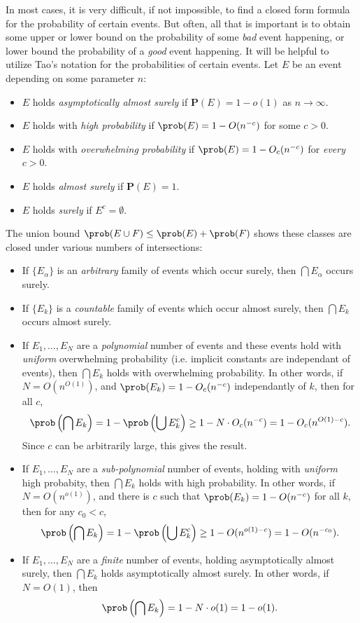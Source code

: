 In most cases, it is very difficult, if not impossible, to find a closed form formula for the probability of certain events. But often, all that is important is to obtain some upper or lower bound on the probability of some {\it bad} event happening, or lower bound the probability of a {\it good} event happening. It will be helpful to utilize Tao's notation for the probabilities of certain events. Let $E$ be an event depending on some parameter $n$:
%
\begin{itemize}
    \item $E$ holds {\it asymptotically almost surely} if $\mathbf{P}(E) = 1 - o(1)$ as $n \to \infty$.
    \item $E$ holds with {\it high probability} if $\prob(E) = 1 - O(n^{-c})$ for some $c > 0$.
    \item $E$ holds with {\it overwhelming probability} if $\prob(E) = 1 - O_c(n^{-c})$ for {\it every} $c > 0$.
    \item $E$ holds {\it almost surely} if $\mathbf{P}(E) = 1$.
    \item $E$ holds {\it surely} if $E^c = \emptyset$.
\end{itemize}
%
The union bound $\prob(E \cup F) \leq \prob(E) + \prob(F)$ shows these classes are closed under various numbers of intersections:
%
\begin{itemize}
    \item If $\{ E_\alpha \}$ is an {\it arbitrary} family of events which occur surely, then $\bigcap E_\alpha$ occurs surely.
    \item If $\{ E_k \}$ is a {\it countable} family of events which occur almost surely, then $\bigcap E_k$ occurs almost surely.
    \item If $E_1, \dots, E_N$ are a {\it polynomial} number of events and these events hold with {\it uniform} overwhelming probability (i.e. implicit constants are independant of events), then $\bigcap E_k$ holds with overwhelming probability. In other words, if $N = O(n^{O(1)})$, and $\prob(E_k) = 1 - O_c(n^{-c})$ independantly of $k$, then for all $c$,
    \[ \prob \left( \bigcap E_k \right) = 1 - \prob \left( \bigcup E_k^c \right) \geq 1 - N \cdot O_c(n^{-c}) = 1 - O_c(n^{O(1) - c}). \]
    Since $c$ can be arbitrarily large, this gives the result.

    \item If $E_1, \dots, E_N$ are a {\it sub-polynomial} number of events, holding with {\it uniform} high probabity, then $\bigcap E_k$ holds with high probability. In other words, if $N = O(n^{o(1)})$, and there is $c$ such that $\prob(E_k) = 1 - O(n^{-c})$ for all $k$, then for any $c_0 < c$,
    \[ \prob \left( \bigcap E_k \right) = 1 - \prob \left( \bigcup E_k^c \right) \geq 1 - O(n^{o(1) - c}) = 1 - O(n^{-c_0}). \]

    \item If $E_1, \dots, E_N$ are a {\it finite} number of events, holding asymptotically almost surely, then $\bigcap E_k$ holds asymptotically almost surely. In other words, if $N = O(1)$, then
    \[ \prob \left( \bigcap E_k \right) = 1 - N \cdot o(1) = 1 - o(1). \]
\end{itemize}
